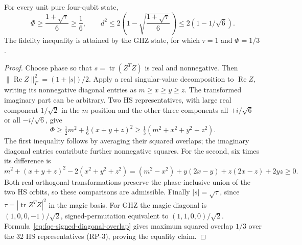 \begin{lemma}\label{lem:fqe-hs-fidelity-floor}
For every unit pure four-qubit state,
\[
 \Phi\ge\frac{1+\sqrt\tau}{6}\ge\frac16,\qquad
 d^2\le2\left(1-\sqrt{\frac{1+\sqrt\tau}{6}}\right)
      \le2(1-1/\sqrt6).
\]
The fidelity inequality is attained by the GHZ state, for which
$\tau=1$ and $\Phi=1/3$.
\end{lemma}
\begin{proof}
Choose phase so that $s=\operatorname{tr}(Z^TZ)$ is real and nonnegative.
Then $\|\operatorname{Re}Z\|_F^2=(1+|s|)/2$.
Apply a real singular-value decomposition to $\operatorname{Re}Z$, writing
its nonnegative diagonal entries as $m\ge x\ge y\ge z$.
The transformed imaginary part can be arbitrary. Two HS representatives,
with large real component $1/\sqrt2$ in the $m$ position and the other
three components all $+i/\sqrt6$ or all $-i/\sqrt6$, give
\[
 \Phi\ge\tfrac12m^2+\tfrac16(x+y+z)^2
       \ge\tfrac13(m^2+x^2+y^2+z^2).
\]
The first inequality follows by averaging their squared overlaps; the
imaginary diagonal entries contribute further nonnegative squares.
For the second, six times its difference is
\[
 m^2+(x+y+z)^2-2(x^2+y^2+z^2)
 =(m^2-x^2)+y(2x-y)+z(2x-z)+2yz\ge0.
\]
Both real orthogonal transformations preserve the phase-inclusive union
of the two HS orbits, so these comparisons are admissible. Finally
$|s|=\sqrt\tau$, since $\tau=|\operatorname{tr}Z^TZ|^2$ in the magic basis. For GHZ the magic
diagonal is $(1,0,0,-1)/\sqrt2$, signed-permutation equivalent to $(1,1,0,0)/\sqrt2$.
Formula~\eqref{eq:fqe-signed-diagonal-overlap}
gives maximum squared overlap $1/3$ over the 32 HS representatives
(RP-3), proving the equality claim.
\end{proof}

